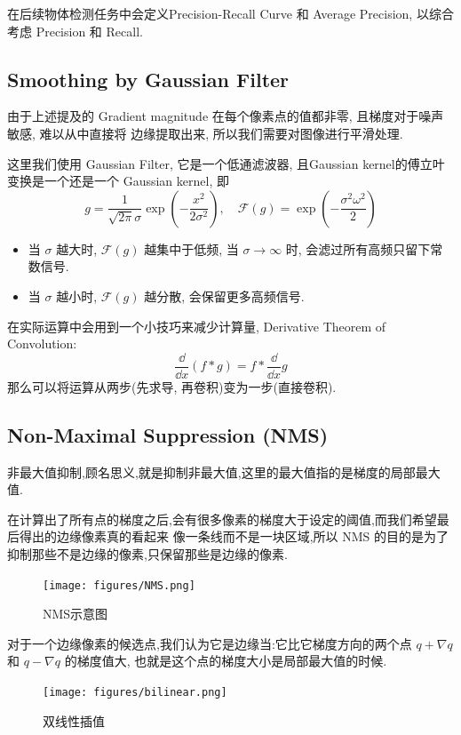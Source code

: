 在后续物体检测任务中会定义Precision-Recall Curve 和 Average Precision, 以综合考虑 Precision 和 Recall.

\subsection{Smoothing by Gaussian Filter}
由于上述提及的 Gradient magnitude 在每个像素点的值都非零, 且梯度对于噪声敏感, 难以从中直接将
边缘提取出来, 所以我们需要对图像进行平滑处理. 

这里我们使用 Gaussian Filter, 它是一个低通滤波器, 且Gaussian kernel的傅立叶变换是一个还是一个 Gaussian kernel, 即
\[
    g = \frac{1}{\sqrt{2\pi}\sigma} \exp\left( -\frac{x^2}{2\sigma^2} \right), \quad \mathcal{F}(g) = \exp \left( -\frac{\sigma^2\omega^2}{2} \right)
\]
\begin{itemize}
    \item 当 $\sigma$ 越大时, $\mathcal{F}(g)$ 越集中于低频, 当 $\sigma \to \infty$ 时, 会滤过所有高频只留下常数信号.
    \item 当 $\sigma$ 越小时, $\mathcal{F}(g)$ 越分散, 会保留更多高频信号.
\end{itemize}
在实际运算中会用到一个小技巧来减少计算量, Derivative Theorem of Convolution:
\[
\frac{\dd }{\dd x} (f * g) = f * \frac{\dd }{\dd x} g
\]
那么可以将运算从两步(先求导, 再卷积)变为一步(直接卷积).


\subsection{Non-Maximal Suppression (NMS)}

非最大值抑制,顾名思义,就是抑制非最大值,这里的最大值指的是梯度的局部最大值.

在计算出了所有点的梯度之后,会有很多像素的梯度大于设定的阈值,而我们希望最后得出的边缘像素真的看起来
像一条线而不是一块区域,所以 NMS 的目的是为了抑制那些不是边缘的像素,只保留那些是边缘的像素.

\begin{figure}[htbp]
    \centering
	\texttt{[image: figures/NMS.png]}
	\caption{NMS示意图}
\end{figure}

对于一个边缘像素的候选点,我们认为它是边缘当:它比它梯度方向的两个点 $q+\nabla q$ 和 $q-\nabla q$ 的梯度值大,
也就是这个点的梯度大小是局部最大值的时候.

\begin{figure}[htbp]
    \centering
	\texttt{[image: figures/bilinear.png]}
	\caption{双线性插值}
\end{figure}

